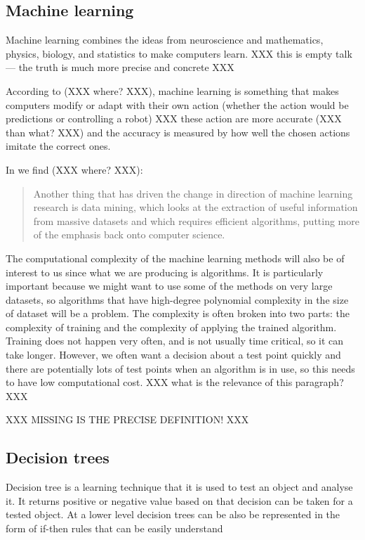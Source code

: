 \documentclass{article}
\begin{document}
\subsection{Machine learning}
\label{sec:machinelearn}

Machine learning combines the ideas from neuroscience and mathematics, physics, biology, and statistics to make computers learn. XXX this is empty talk --- the truth is much more precise and concrete XXX

According to \cite{MachineLearning2009AlgorithmicPerspective} (XXX where? XXX), machine learning is something that makes computers modify or adapt with their own action (whether the action would be predictions or controlling a robot) XXX these action are more accurate (XXX than what? XXX) and the accuracy is measured by how well the chosen actions imitate the correct ones.

In \cite{MachineLearning2009AlgorithmicPerspective} we find (XXX where? XXX):
\begin{quote}
  Another thing that has driven the change in direction of machine learning research is data mining, which looks at the extraction of useful information from massive datasets and which requires efficient algorithms, putting more of the emphasis back onto computer science.
\end{quote}
The computational complexity of the machine learning methods will also be of interest to us since what we are producing is algorithms. It is particularly important because we might want to use some of the methods on very large datasets, so algorithms that have high-degree polynomial complexity in the size of dataset will be a problem. The complexity is often broken into two parts: the complexity of training and the complexity of applying the trained algorithm.
Training does not happen very often, and is not usually time critical, so it can take longer. However, we often want a decision about a test point quickly and there are potentially lots of test points when an algorithm is in use, so this needs to have low computational cost. XXX what is the relevance of this paragraph? XXX

XXX MISSING IS THE PRECISE DEFINITION! XXX


\subsection{Decision trees}
\label{sec:dectree}


Decision tree is a learning technique that it is used to test an object and analyse it. It returns positive or negative value based on that decision can be taken for a tested object. At a lower level decision trees can be also be represented in the form of if-then rules that can be easily understand
\end{document}
